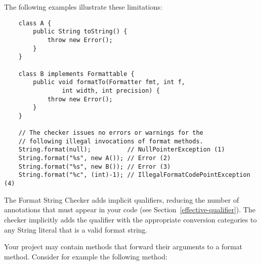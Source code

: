 \noindent The following examples illustrate these limitations:

\begin{Verbatim}
    class A {
        public String toString() {
            throw new Error();
        }
    }

    class B implements Formattable {
        public void formatTo(Formatter fmt, int f,
                int width, int precision) {
            throw new Error();
        }
    }

    // The checker issues no errors or warnings for the
    // following illegal invocations of format methods.
    String.format(null);          // NullPointerException (1)
    String.format("%s", new A()); // Error (2)
    String.format("%s", new B()); // Error (3)
    String.format("%c", (int)-1); // IllegalFormatCodePointException (4)
\end{Verbatim}

%
%



The Format String Checker adds implicit
qualifiers, reducing the number of annotations that must appear in your code
(see Section~\ref{effective-qualifier}).
The checker implicitly adds the  qualifier with the appropriate
conversion categories to any String literal that is a valid format string.



Your project may contain methods that forward their arguments to a format method.
Consider for example the following  method:


